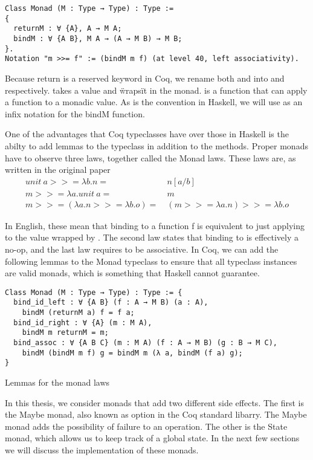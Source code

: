\begin{verbatim}
Class Monad (M : Type → Type) : Type :=
{
  returnM : ∀ {A}, A → M A;
  bindM : ∀ {A B}, M A → (A → M B) → M B;
}.
Notation "m >>= f" := (bindM m f) (at level 40, left associativity).
\end{verbatim}

Because return is a reserved keyword in Coq, we rename both  and 
 into  and  respectively.
 takes a value and \"wraps\" it in the monad.  is
a function that can apply a function to a monadic value. As is the convention
in Haskell, we will use \coq{>>= } as an infix notation for the bindM
function.

One of the advantages that Coq typeclasses have over those in Haskell is the
abilty to add lemmas to the typeclass in addition to the methods. Proper monads
have to observe three laws, together called the Monad laws. These laws are, as
written in the original paper
\begin{align*}
    \textit{unit}\ a >>= \lambda b. n =&\ n[a/b] \\
    m >>= \lambda a . \textit{unit}\ a =&\ m \\
    m >>= (\lambda a.n >>= \lambda b.o) =&\ (m >>= \lambda a.n) >>= \lambda b.o
\end{align*}

In English, these mean that binding  to a function f is
equivalent to just applying  to the value wrapped by . The
second law states that binding to  is effectively a no-op, and
the last law requires  to be associative. In Coq, we can add the
following lemmas to the Monad typeclass to ensure that all typeclass instances
are valid monads, which is something that Haskell cannot guarantee. 

\begin{listing}[H]
\begin{verbatim}
Class Monad (M : Type → Type) : Type := {
  bind_id_left : ∀ {A B} (f : A → M B) (a : A), 
    bindM (returnM a) f = f a;
  bind_id_right : ∀ {A} (m : M A),
    bindM m returnM = m;
  bind_assoc : ∀ {A B C} (m : M A) (f : A → M B) (g : B → M C),
    bindM (bindM m f) g = bindM m (λ a, bindM (f a) g);
}
\end{verbatim}
\caption{Lemmas for the monad laws}
\label{lst:monad_lemmas}
\end{listing}

In this thesis, we consider monads that add two different side effects. The
first is the Maybe monad, also known as option in the Coq standard libarry. 
The Maybe monad adds the
possibility of failure to an operation. The other is the State monad, which
allows us to keep track of a global state. In the next few sections we will
discuss the implementation of these monads.

